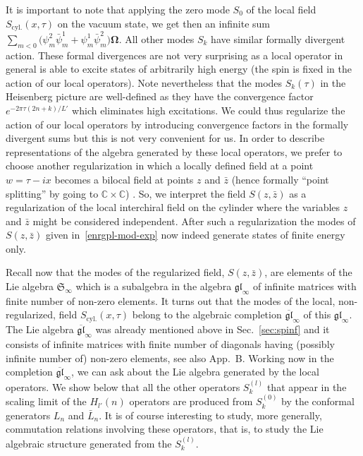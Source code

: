 \documentclass[11pt]{article}
\newcommand{\sfermp}{\psi^{2}}
\newcommand{\sfermm}{\psi^{1}}
\newcommand{\bsfermp}{\bar{\psi}^{2}}
\newcommand{\bsfermm}{\bar{\psi}^{1}}
\newcommand{\vac}{\boldsymbol{\Omega}}
\newcommand{\oC}{\mathbb{C}}
\newcommand{\interLie}{\mathfrak{S}}
\newcommand{\glinf}{\gl_{\infty}}
\newcommand{\bglinf}{\overline{\gl}_{\infty}}
\newcommand{\interinfin}{\interLie_{\infty}}
\newcommand{\gl}{\mathfrak{gl}}
\newcommand{\bz}{\bar{z}}
\newcommand{\enrg}{S}
\newcommand{\enrgcyl}{\enrg_{\text{cyl.}}}
\newcommand{\LL}{L'}
\newcommand{\Appglinf}{B}
\theoremstyle{definition}
\begin{document}
It is important to note that  applying the zero mode $\enrg_0$ of the local field $\enrgcyl(x,\tau)$  on the vacuum state, we get then an infinite sum
$\sum_{m<0} \bigl(\sfermp_{m}\bsfermm_m + \sfermm_{m}\bsfermp_m \bigr)\vac$. All other modes $\enrg_k$ have similar formally divergent action. These formal divergences are not very surprising as a local operator in general is able to excite states of arbitrarily high energy (the spin is fixed in the action of our local operators). Note nevertheless that the  modes $\enrg_k(\tau)$ in the Heisenberg picture are well-defined as they have the convergence factor $e^{-2\pi \tau(2n+k)/\LL}$ which eliminates high excitations. We could thus regularize the action of our local operators by introducing convergence factors in the formally divergent sums but this is not very convenient for us. In order to describe representations of the algebra generated by these local operators, we prefer to choose another regularization in which a locally defined field at a point $w=\tau-ix$ becomes a bilocal field at points $z$ and $\bz$ (hence formally ``point splitting'' by going to $\oC\times \oC$) .
So, we interpret the field $S(z,\bz)$ as  a regularization of the local interchiral field on the cylinder
where the variables $z$ and $\bz$ might be considered independent. After such a regularization the modes of $S(z,\bz)$ given in~\eqref{enrgpl-mod-exp} now indeed generate states of finite energy only.

Recall now that the modes of the regularized field, $S(z,\bz)$, are elements of the Lie algebra $\interinfin$ which is a subalgebra in the algebra $\glinf$ of infinite matrices with finite number of non-zero elements. It turns out that the modes of the local, non-regularized, field  $\enrgcyl(x,\tau)$ belong to the algebraic completion $\bglinf$ of this $\glinf$. The Lie algebra $\bglinf$ was already mentioned above in Sec.~\ref{sec:spinf} and it consists of infinite matrices with finite number of diagonals having (possibly infinite number of) non-zero elements, see also App.~\Appglinf.
Working now in the completion $\bglinf$, we can ask about the Lie algebra generated by the local operators.
We show below that all the other operators $\enrg^{(l)}_{k}$ that appear in
the scaling limit of the $H_{l'}(n)$ operators
 are produced from
$\enrg^{(0)}_{k}$ by the conformal generators $L_n$ and $\bar{L}_n$. It is  of course interesting
to study, more generally,   commutation relations involving these operators, that is, to study
the Lie algebraic structure generated from the $\enrg^{(l)}_k$.
\end{document}
